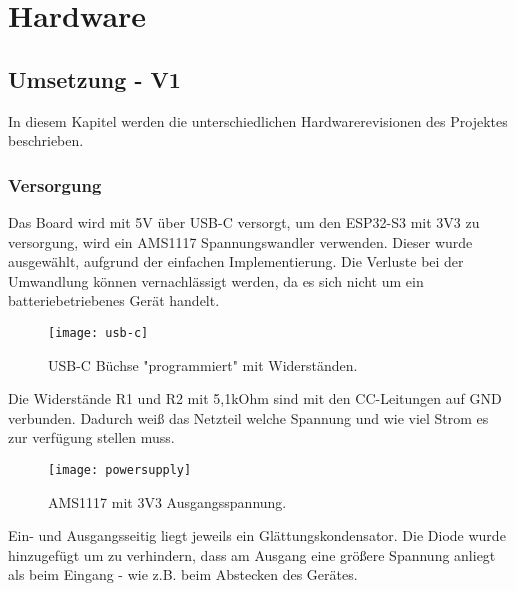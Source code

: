 \graphicspath{ {HW-PIC/} }


\chapter{Hardware}

    \section{Umsetzung - V1}
    
    In diesem Kapitel werden die unterschiedlichen Hardwarerevisionen des Projektes
    beschrieben. 

        \subsection{Versorgung}
        Das Board wird mit 5V über USB-C versorgt, um den ESP32-S3 mit 3V3 zu 
        versorgung, wird ein AMS1117 Spannungswandler verwenden. Dieser wurde ausgewählt, 
        aufgrund der einfachen Implementierung. Die Verluste bei der Umwandlung können vernachlässigt werden, da 
        es sich nicht um ein batteriebetriebenes Gerät handelt.

            \begin{figure}[h]
                \centering
                \texttt{[image: usb-c]}
                \caption{USB-C Büchse "programmiert" mit Widerständen.}
                \label{fig:sch1}

            \end{figure}

        Die Widerstände R1 und R2 mit 5,1kOhm sind mit den CC-Leitungen auf GND verbunden.
        Dadurch weiß das Netzteil welche Spannung und wie viel Strom es zur verfügung stellen
        muss. 

            \begin{figure}[h]
                \centering
                \texttt{[image: powersupply]}
                \caption{AMS1117 mit 3V3 Ausgangsspannung.}
                \label{fig:sch2}
                
            \end{figure}

        Ein- und Ausgangsseitig liegt jeweils ein Glättungskondensator. Die Diode wurde hinzugefügt 
        um zu verhindern, dass am Ausgang eine größere Spannung
        anliegt als beim Eingang - wie z.B. beim Abstecken des Gerätes.

        \newpage

